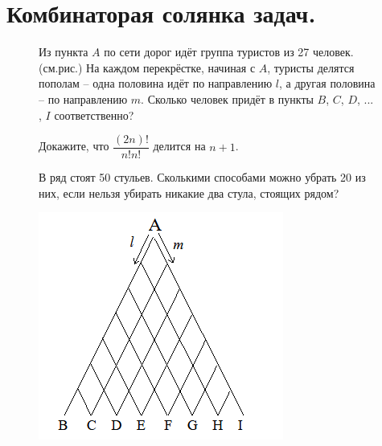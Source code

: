 \section{Комбинаторая солянка задач.}

\begin{figure}[H]
\begin{minipage}{0.59\linewidth}\setlength{\parindent}{1.5em}
    \begin{thm}
        Из пункта $A$ по сети дорог идёт группа туристов из 27 человек. (см.рис.) На каждом перекрёстке, начиная с $A$, туристы делятся пополам – одна половина идёт по направлению $l$, а другая половина – по направлению $m$. Сколько человек придёт в пункты $B$, $C$, $D$, ... , $I$ соответственно?
    \end{thm}
    \begin{thm}
        Докажите, что $\dfrac{(2n)!}{n!n!}$ делится на $n + 1$.
    \end{thm}
    \begin{thm}
        В ряд стоят 50 стульев. Сколькими способами можно убрать 20 из них, если нельзя убирать никакие два стула, стоящих рядом?
    \end{thm}
\end{minipage}
\hfill
\begin{minipage}{0.4\linewidth}
    \includegraphics[width=0.95\columnwidth]{img/9.0 triangle.png}
\end{minipage}
\end{figure} 

